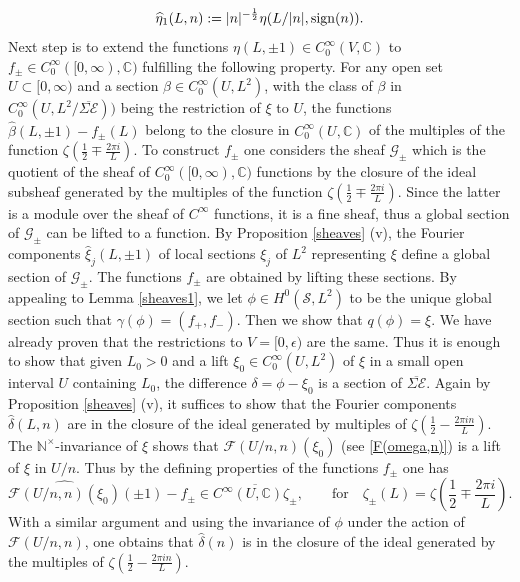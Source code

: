 \documentclass{pspum-l}
\theoremstyle{definition}
\theoremstyle{remark}
\numberwithin{equation}{section}
\def\C{{\mathbb C}}
\def\cE{{\mathcal E}}
\def\cF{{\mathcal F}}
\def\cG{{\mathcal G}}
\def\nt{\N^{\times}}
\def\N{{\mathbb N}}
\def\scal2{{\mathscr S}}
\begin{document}
  \[
  \widehat \eta_1(L,n):=\vert n\vert^{-\frac 12}\eta(L/\vert n\vert,{\rm sign}(n)).
  \]
 Next step is to extend the functions $\eta(L,\pm 1)\in C_0^{\infty}(V,\C)$ to  $f_\pm\in  C_0^{\infty}([0,\infty),\C)$  fulfilling the following property. For any open set $U\subset [0,\infty)$ and a section $\beta\in C_0^{\infty}(U,L^2)$, with the class of $\beta$ in $C_0^{\infty}(U,L^2/\overline{\Sigma\cE}))$ being the restriction of $\xi$ to $U$, the functions $
 \widehat \beta(L,\pm 1)-f_\pm(L)
 $ 
 belong to the closure  in $C_0^{\infty}(U,\C)$ of the multiples of the function $\zeta\left(\frac 12\mp\frac{2\pi i }{L}\right)$. To construct $f_\pm$ one considers the sheaf $\cG_\pm$ which is the quotient of the sheaf of $C_0^{\infty}([0,\infty),\C)$ functions by the closure of the ideal subsheaf generated by the multiples of the function $\zeta\left(\frac 12\mp\frac{2\pi i }{L}\right)$. Since the latter is a module over the sheaf of $C^{\infty}$ functions, it is a fine sheaf, thus a global section  of $\cG_\pm$ can be lifted to a function. By Proposition \ref{sheaves} (v), the Fourier components $\widehat \xi_j(L,\pm 1)$ of local sections $\xi_j$ of $L^2$ representing $\xi$ define a global section of $\cG_\pm$. The functions $f_\pm$ are obtained by lifting these sections. By appealing to Lemma \ref{sheaves1}, we let $\phi \in H^0(\scal2,L^2)$ to be the unique global section such that $\gamma(\phi)=(f_+,f_-)$. Then we show that $q(\phi)=\xi$.  We have already proven that the restrictions to $V=[0,\epsilon)$ are the same. Thus it is enough to show that given $L_0>0$ and a lift $\xi_0\in C_0^{\infty}(U,L^2)$ of $\xi$ in a small open interval $U$ containing $L_0$, the difference $\delta=\phi-\xi_0$ is a section of $\overline{\Sigma\cE}$. Again by Proposition \ref{sheaves} (v), it suffices to show that the Fourier components  $\widehat \delta(L,n)$ are in the closure of the ideal generated by multiples of $\zeta\left(\frac 12-\frac{2\pi in }{L}\right)$. The $\nt$-invariance of $\xi$ shows that $\cF(U/n,n)(\xi_0)$ (see \eqref{F(omega,n)}) is a lift of $\xi$ in $U/n$. Thus by the defining properties of the functions $f_\pm$ one has 
 \[
 \widehat{\cF(U/n,n)(\xi_0)}(\pm 1)-f_\pm \in \overline{C^{\infty}(U,\C)\zeta_\pm}, \qquad\text{for}\quad   \zeta_\pm(L)=\zeta\left(\frac 12\mp\frac{2\pi i }{L}\right).
 \]
  With a similar argument and using the invariance of $\phi$ under the action of $\cF(U/n,n)$,    one obtains that $\widehat \delta(n)$ is in the closure of the ideal generated by the   multiples of $\zeta\left(\frac 12-\frac{2\pi in }{L}\right)$.\newline
\end{document}
